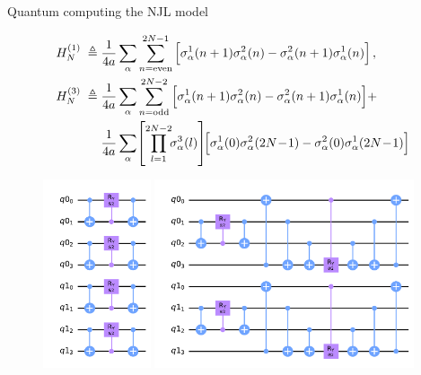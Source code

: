 \begin{frame}[allowframebreaks]{Quantum computing the NJL model}
  \begin{minipage}[c]{\linewidth}
  \vspace{-1em}
  \footnotesize{\begin{align*}
    H_{N}^{(1)} \;\defeq\;&
      \frac{1}{4a} \sum_\alpha \sum_{n=\text{even}}^{2N-1}
      \qty[
        \sigma_\alpha^{1}(n+1) \sigma_\alpha^{2}(n) -
        \sigma_\alpha^{2}(n+1) \sigma_\alpha^{1}(n)
      ] \qc\\
    H_{N}^{(3)} \;\defeq\;&
      \frac{1}{4a} \sum_\alpha \sum_{n=\text{odd}}^{2N-2}
      \qty[
        \sigma_\alpha^{1}(n+1) \sigma_\alpha^{2}(n) -
        \sigma_\alpha^{2}(n+1) \sigma_\alpha^{1}(n)
      ] +\\&
      \frac{1}{4a} \sum_\alpha \!
      \qty[\prod_{l=1}^{2N-2} \!\! \sigma_\alpha^3(l)] \!
      \qty[
        \sigma_\alpha^{1}(0) \sigma_\alpha^{2}(2N \!-\! 1) -
        \sigma_\alpha^{2}(0) \sigma_\alpha^{1}(2N \!-\! 1)
      ]
  \end{align*}}
  \vspace{-1em}
  \begin{figure}[!p]
  	\centering
  	\begin{minipage}[c]{.20\linewidth}
  		\centering
  		\includegraphics[height=15em]{Figures/chapter06/H1-rotation}
  	\end{minipage}
  	\hspace{1em}
  	\begin{minipage}[c]{.50\linewidth}
  		\centering
  		\includegraphics[height=15em]{Figures/chapter06/H3-rotation}
  	\end{minipage}
  \end{figure}
  \vspace{-2em}
  \end{minipage}


\end{frame}


